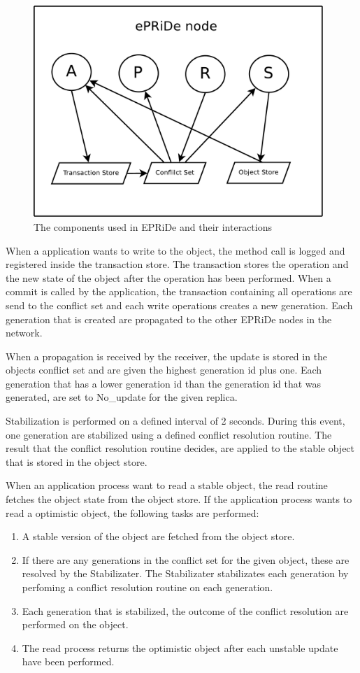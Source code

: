 \begin{figure}[htb]
\centerline{\includegraphics[height=8cm]{components.pdf}}
\caption{The components used in EPRiDe and their interactions}\label{fig:components}
\end{figure}


When a application wants to write to the object, the method call is logged and registered inside the transaction store. The transaction stores the operation and the new state of the object after the operation has been performed. When a commit is called by the application, the transaction containing all operations are send to the conflict set and each write operations creates a new generation. Each generation that is created are propagated to the other EPRiDe nodes in the network. 

When a propagation is received by the receiver, the update is stored in the objects conflict set and are given the highest generation id plus one. Each generation that has a lower generation id than the generation id that was generated, are set to No\_update for the given replica. 

Stabilization is performed on a defined interval of 2 seconds. During this event, one generation are stabilized using a defined conflict resolution routine. The result that the conflict resolution routine decides, are applied to the stable object that is stored in the object store.
  


When an application process want to read a stable object, the read routine fetches the object state from the object store. If the application process wants to read a optimistic object, the following tasks are performed: 
\begin{enumerate}
	\item A stable version of the object are fetched from the object store.
	\item If there are any generations in the conflict set for the given object, these are resolved by the Stabilizater. The Stabilizater stabilizates each generation by perfoming a conflict resolution routine on each generation. 
	\item Each generation that is stabilized, the outcome of the conflict resolution are performed on the object. 
	\item The read process returns the optimistic object after each unstable update have been performed.
\end{enumerate}

